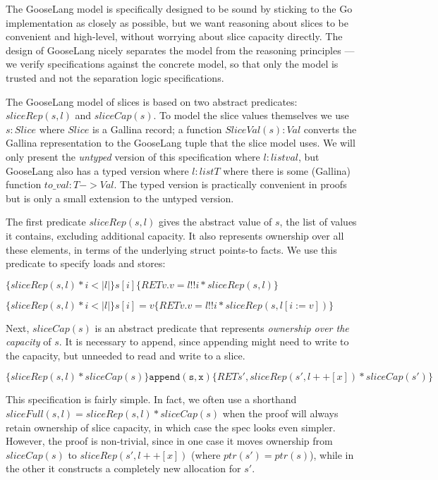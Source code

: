 The GooseLang model is specifically designed to be sound by sticking to
the Go implementation as closely as possible, but we want reasoning
about slices to be convenient and high-level, without worrying about
slice capacity directly. The design of GooseLang nicely separates the
model from the reasoning principles --- we verify specifications against
the concrete model, so that only the model is trusted and not the
separation logic specifications.

The GooseLang model of slices is based on two abstract predicates:
\(sliceRep(s, l)\) and \(sliceCap(s)\). To model the slice values
themselves we use \(s : Slice\) where \(Slice\) is a Gallina record; a
function \(SliceVal(s) : Val\) converts the Gallina representation to
the GooseLang tuple that the slice model uses. We will only present the
\emph{untyped} version of this specification where \(l : list val\), but
GooseLang also has a typed version where \(l : list T\) where there is
some (Gallina) function \(to\_val : T -> Val\). The typed version is
practically convenient in proofs but is only a small extension to the
untyped version.

The first predicate \(sliceRep(s, l)\) gives the abstract value of
\(s\), the list of values it contains, excluding additional capacity. It
also represents ownership over all these elements, in terms of the
underlying struct points-to facts. We use this predicate to specify
loads and stores:

\(\{sliceRep(s, l) * i < |l|\} s[i] \{RET v. v = l !! i * sliceRep(s, l)\}\)

\(\{sliceRep(s, l) * i < |l|\} s[i] = v \{RET v. v = l !! i * sliceRep(s, l[i := v])\}\)

Next, \(sliceCap(s)\) is an abstract predicate that represents
\emph{ownership over the capacity} of \(s\). It is necessary to append,
since appending might need to write to the capacity, but unneeded to
read and write to a slice.

\(\{sliceRep(s, l) * sliceCap(s)\} \mathtt{append(s, x)} \{RET s', sliceRep(s', l ++ [x]) * sliceCap(s')\}\)

This specification is fairly simple. In fact, we often use a shorthand
\(sliceFull(s, l) = sliceRep(s, l) * sliceCap(s)\) when the proof will
always retain ownership of slice capacity, in which case the spec looks
even simpler. However, the proof is non-trivial, since in one case it
moves ownership from \(sliceCap(s)\) to \(sliceRep(s', l ++ [x])\)
(where \(ptr(s') = ptr(s)\)), while in the other it constructs a
completely new allocation for \(s'\).

